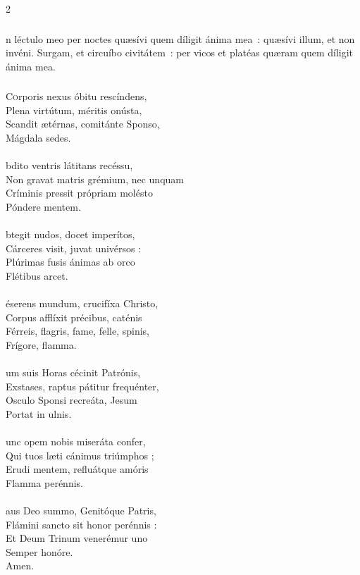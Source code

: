 \documentclass[9pt,twoside]{extarticle}
\begin{document}
\begin{multicols}{2}
{{\subsubsection*{}
n léctulo meo per noctes quæsívi quem díligit ánima mea~: quæsívi illum, et non invéni. Surgam, et circuíbo civitátem~: per vicos et platéas quæram quem díligit ánima mea.

\subsubsection*{\center {}}
\lettrine{C}orporis nexus óbitu rescíndens,\\
Plena virtútum, méritis onústa,\\
Scandit ætérnas, comitánte Sponso,\\
Mágdala sedes.\\
\\
bdito ventris látitans recéssu,\\
Non gravat matris grémium, nec unquam\\
Críminis pressit própriam molésto\\
Póndere mentem.\\
\\
btegit nudos, docet imperítos,\\
Cárceres visit, juvat univérsos :\\
Plúrimas fusis ánimas ab orco\\
Flétibus arcet.\\
\\
éserens mundum, crucifíxa Christo,\\
Corpus afflíxit précibus, caténis\\
Férreis, flagris, fame, felle, spinis,\\
Frígore, flamma.\\
\\
um suis Horas cécinit Patrónis,\\
Exstases, raptus pátitur frequénter,\\
Osculo Sponsi recreáta, Jesum\\
Portat in ulnis.\\
\\
unc opem nobis miseráta confer,\\
Qui tuos læti cánimus triúmphos ;\\
Erudi mentem, refluátque amóris\\
Flamma perénnis.\\
\\
aus Deo summo, Genitóque Patris,\\
Flámini sancto sit honor perénnis :\\
Et Deum Trinum venerémur uno\\
Semper honóre.\\
Amen.

}}
\end{multicols}
\end{document}
